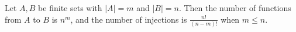 Let $A, B$ be finite sets with $\lvert A \rvert = m$ and $\lvert B \rvert = n$.
Then the number of functions from $A$ to $B$ is $n^{m}$, and the number of injections is $\frac{n!}{(n - m)!}$ when $m \leq n$.